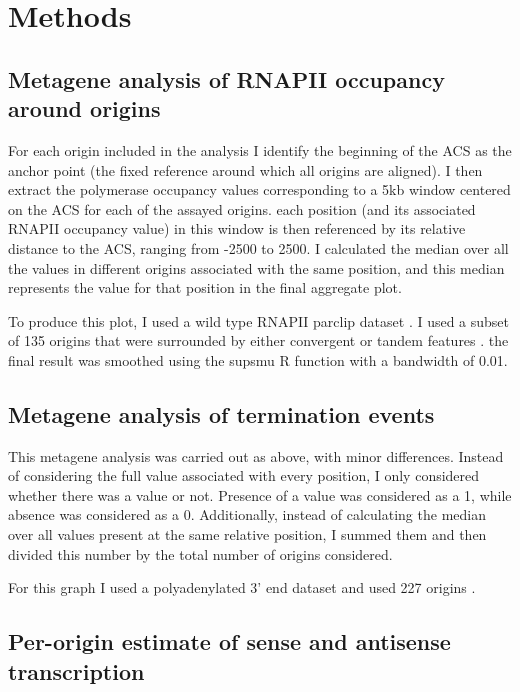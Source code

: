 \chapter*{\textbf{Methods}}

\section*{Metagene analysis of RNAPII occupancy around origins}
For each origin included in the analysis I identify the beginning of the ACS as the anchor point (the fixed reference around which all origins are aligned). I then extract the polymerase occupancy values corresponding to a 5kb window centered on the ACS for each of the assayed origins. each position (and its associated RNAPII occupancy value) in this window is then referenced by its relative distance to the ACS, ranging from -2500 to 2500. I calculated the median over all the values in different origins associated with the same position, and this median represents the value for that position in the final aggregate plot.

To produce this plot, I used a wild type RNAPII parclip dataset \cite{schaughency:2014:genomewide}. I used a subset of 135 origins \cite{nieduszynski:2006:genomewide} that were surrounded by either convergent or tandem features \cite{xu:2009:bidirectional}. the final result was smoothed using the supsmu R function \cite{rproject} with a bandwidth of 0.01.

\section*{Metagene analysis of termination events}

This metagene analysis was carried out as above, with minor differences. Instead of considering the full value associated with every position, I only considered whether there was a value or not. Presence of a value was considered as a 1, while absence was considered as a 0. Additionally, instead of calculating the median over all values present at the same relative position, I summed them and then divided this number by the total number of origins considered.

For this graph I used a polyadenylated 3’ end dataset \cite{wilkening:2013:efficient} and used 227 origins \cite{nieduszynski:2006:genomewide}.

\section*{Per-origin estimate of sense and antisense transcription}

